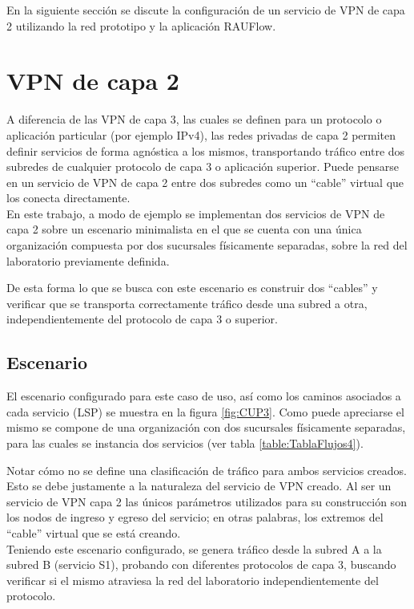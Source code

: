 En la siguiente secci\'on se discute la configuraci\'on de un servicio de VPN de capa 2 utilizando la red prototipo y la aplicaci\'on RAUFlow.

\section{VPN de capa 2}

A diferencia de las VPN de capa 3, las cuales se definen para un protocolo o aplicaci\'on particular  
 (por ejemplo IPv4), las redes privadas de capa 2 permiten definir servicios de forma agnóstica a los mismos, transportando tr\'afico entre dos subredes de cualquier protocolo de capa 3 o aplicación superior. Puede pensarse en un servicio de VPN de capa 2 entre dos subredes como un “cable” virtual que los conecta directamente.\\

En este trabajo, a modo de ejemplo se implementan dos servicios de VPN de capa 2 sobre un escenario minimalista en el que se cuenta con una \'unica organización compuesta por dos sucursales físicamente separadas, sobre la red del laboratorio previamente definida.

De esta forma lo que se busca con este escenario es construir dos “cables” y verificar que se transporta correctamente tr\'afico desde una subred a otra, independientemente del protocolo de capa 3 o superior.

\subsection{Escenario}
El escenario configurado para este caso de uso, as\'i como los caminos asociados a cada servicio (LSP) se muestra en la figura \ref{fig:CUP3}. Como puede apreciarse el mismo se compone de una organización con dos sucursales físicamente separadas, para las cuales se instancia dos servicios (ver tabla \ref{table:TablaFlujos4}). 

Notar c\'omo no se define una clasificaci\'on de tr\'afico para ambos servicios creados. Esto se debe justamente a la naturaleza del servicio de VPN creado. Al ser un servicio de VPN capa 2 las \'unicos par\'ametros utilizados para su construcci\'on son los nodos de ingreso y egreso del servicio; en otras palabras, los extremos del “cable” virtual que se est\'a creando.\\

Teniendo este escenario configurado, se genera tr\'afico desde la subred A a la subred B (servicio S1), probando con diferentes protocolos de capa 3, buscando verificar si el mismo atraviesa la red del laboratorio independientemente del protocolo. \\

